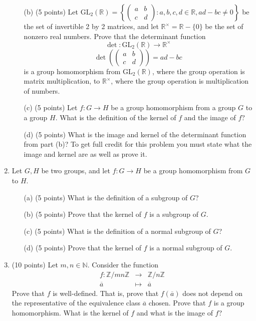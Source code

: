 \documentclass[11pt]{article}
\newcommand{\N}{\mathbb{N}}
\newcommand{\R}{\mathbb{R}}
\newcommand{\Z}{\mathbb{Z}}
\newcommand{\GL}{\text{GL}}
\begin{document}
\begin{enumerate}
\begin{enumerate}
\vspace{4cm}

\item[(b)] (5 points) Let $\GL_2(\R) = \left\{\begin{pmatrix} a & b \\ c & d\end{pmatrix}: a,b,c, d\in \R, ad-bc\not=0\right\}$ be the set of invertible 2 by 2 matrices, and let $\R^\times = \R - \{0\}$ be the set of nonzero real numbers. Prove that the determinant function
$$\det:\GL_2(\R)\longrightarrow \R^\times$$
$$\det\left(\begin{pmatrix} a & b\\c & d\end{pmatrix}\right) = ad-bc$$
is a group homomorphism from $\GL_2(\R)$, where the group operation is matrix multiplication, to $\R^\times$, where the group operation is multiplication of numbers.
\pagebreak

\item[(c)] (5 points) Let $f:G\rightarrow H$ be a group homomorphism from a group $G$ to a group $H$. What is the definition of the kernel of $f$ and the image of $f$?
\vspace{6cm}

\item[(d)] (5 points) What is the image and kernel of the determinant function from part (b)? To get full credit for this problem you must state what the image and kernel are as well as prove it.
\pagebreak
\end{enumerate}

\item Let $G, H$ be two groups, and let $f:G\rightarrow H$ be a group homomorphism from $G$ to $H$. \begin{enumerate} \item[(a)] (5 points) What is the definition of a subgroup of $G$?
\vspace{6cm}

\item[(b)] (5 points) Prove that the kernel of $f$ is a subgroup of $G$.
\pagebreak
\item[(c)] (5 points) What is the definition of a normal subgroup of $G$?
\vspace{5cm}
\item[(d)] (5 points) Prove that the kernel of $f$ is a normal subgroup of $G$.
\pagebreak
\end{enumerate}

\item (10 points) Let $m,n\in\N$. Consider the function
$$\begin{array}{rcl} f:\Z/mn\Z &\longrightarrow &\Z/n\Z\\
						\overline{a} & \longmapsto &\overline{a}\end{array}$$
Prove that $f$ is well-defined. That is, prove that $f(\overline{a})$ does not depend on the representative of the equivalence class $\overline{a}$ chosen. Prove that $f$ is a group homomorphism. What is the kernel of $f$ and what is the image of $f$?
\pagebreak


\end{enumerate}
\end{document}
